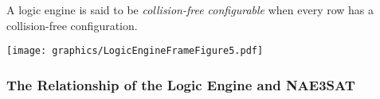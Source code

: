 \documentclass[10pt]{CSUNthesis}
\theoremstyle{plain}%
\theoremstyle{definition}
\theoremstyle{remark}
\begin{document}
A logic engine is said to be \textit{collision-free configurable} when every row has a collision-free configuration.

\begin{minipage}{\linewidth}
\begin{center}
\texttt{[image: graphics/LogicEngineFrameFigure5.pdf]}
\label{fig:LogicEngineFrameFigure5.pdf}
\end{center}
\end{minipage}

\subsubsection{The Relationship of the Logic Engine and NAE3SAT}
\end{document}
